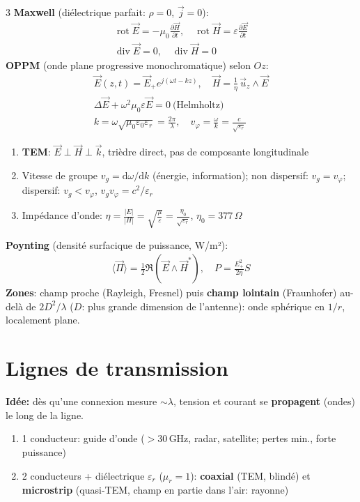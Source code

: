 \documentclass[12pt, a4paper]{article}
\newcommand{\dd}{\mathrm{d}}
\newcommand{\ve}[1]{\vec{#1}}
\newcommand{\rot}{\operatorname{rot}}
\newcommand{\dv}{\operatorname{div}}
\begin{document}
\begin{multicols*}{3}
	\textbf{Maxwell} (diélectrique parfait: $\rho=0$, $\ve j=0$):
	\begin{gather*}
		\rot\ve E=-\mu_0\frac{\partial\ve H}{\partial t},\quad\rot\ve H=\varepsilon\frac{\partial\ve E}{\partial t}\\
		\dv\ve E=0,\quad\dv\ve H=0
	\end{gather*}
	\textbf{OPPM} (onde plane progressive monochromatique) selon $Oz$:
	\begin{gather*}
		\ve E(z,t)=\ve E_+e^{j(\omega t-kz)},\quad\ve H=\frac{1}{\eta}\,\ve u_z\wedge\ve E\\
		\Delta\ve E+\omega^2\mu_0\varepsilon\ve E=0\ \text{(Helmholtz)}\\
		k=\omega\sqrt{\mu_0\varepsilon_0\varepsilon_r}=\frac{2\pi}{\lambda},\quad v_\varphi=\frac{\omega}{k}=\frac{c}{\sqrt{\varepsilon_r}}
	\end{gather*}
	\begin{enumerate}[\roman*.]
		\item \textbf{TEM}: $\ve E\perp\ve H\perp\ve k$, trièdre direct, pas de composante longitudinale
		\item Vitesse de groupe $v_g=\dd\omega/\dd k$ (énergie, information); non dispersif: $v_g=v_\varphi$; dispersif: $v_g<v_\varphi$, $v_gv_\varphi=c^2/\varepsilon_r$
		\item Impédance d'onde: $\eta=\frac{|E|}{|H|}=\sqrt{\frac{\mu}{\varepsilon}}=\frac{\eta_0}{\sqrt{\varepsilon_r}}$, $\eta_0=377\,\Omega$
	\end{enumerate}
	\textbf{Poynting} (densité surfacique de puissance, W/m²):
	\begin{gather*}
		\langle\ve\Pi\rangle=\tfrac12\Re(\ve E\wedge\ve H^*),\quad P=\frac{E_+^2}{2\eta}S
	\end{gather*}
	\textbf{Zones}: champ proche (Rayleigh, Fresnel) puis \textbf{champ lointain} (Fraunhofer) au-delà de $2D^2/\lambda$ ($D$: plus grande dimension de l'antenne): onde sphérique en $1/r$, localement plane.


	\colbreak
	\section{Lignes de transmission}
	\textbf{Idée:} dès qu'une connexion mesure $\sim\lambda$, tension et courant se \textbf{propagent} (ondes) le long de la ligne.
	\begin{enumerate}[\roman*.]
		\item 1 conducteur: guide d'onde ($>30$\,GHz, radar, satellite; pertes min., forte puissance)
		\item 2 conducteurs + diélectrique $\varepsilon_r$ ($\mu_r=1$): \textbf{coaxial} (TEM, blindé) et \textbf{microstrip} (quasi-TEM, champ en partie dans l'air: rayonne)
	\end{enumerate}


\end{multicols*}
\end{document}

